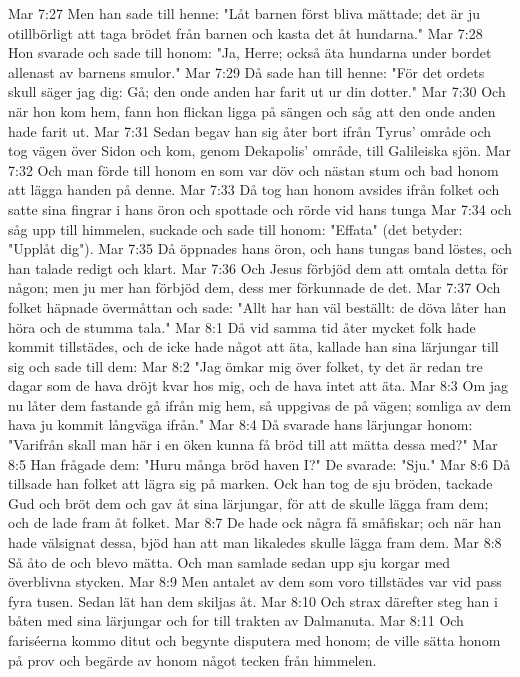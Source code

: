Mar 7:27  Men han sade till henne: "Låt barnen först bliva mättade; det är ju otillbörligt att taga brödet från barnen och kasta det åt hundarna."
Mar 7:28  Hon svarade och sade till honom: "Ja, Herre; också äta hundarna under bordet allenast av barnens smulor."
Mar 7:29  Då sade han till henne: "För det ordets skull säger jag dig: Gå; den onde anden har farit ut ur din dotter."
Mar 7:30  Och när hon kom hem, fann hon flickan ligga på sängen och såg att den onde anden hade farit ut.
Mar 7:31  Sedan begav han sig åter bort ifrån Tyrus' område och tog vägen över Sidon och kom, genom Dekapolis' område, till Galileiska sjön.
Mar 7:32  Och man förde till honom en som var döv och nästan stum och bad honom att lägga handen på denne.
Mar 7:33  Då tog han honom avsides ifrån folket och satte sina fingrar i hans öron och spottade och rörde vid hans tunga
Mar 7:34  och såg upp till himmelen, suckade och sade till honom: "Effata" (det betyder: "Upplåt dig").
Mar 7:35  Då öppnades hans öron, och hans tungas band löstes, och han talade redigt och klart.
Mar 7:36  Och Jesus förbjöd dem att omtala detta för någon; men ju mer han förbjöd dem, dess mer förkunnade de det.
Mar 7:37  Och folket häpnade övermåttan och sade: "Allt har han väl beställt: de döva låter han höra och de stumma tala."
Mar 8:1  Då vid samma tid åter mycket folk hade kommit tillstädes, och de icke hade något att äta, kallade han sina lärjungar till sig och sade till dem:
Mar 8:2  "Jag ömkar mig över folket, ty det är redan tre dagar som de hava dröjt kvar hos mig, och de hava intet att äta.
Mar 8:3  Om jag nu låter dem fastande gå ifrån mig hem, så uppgivas de på vägen; somliga av dem hava ju kommit långväga ifrån."
Mar 8:4  Då svarade hans lärjungar honom: "Varifrån skall man här i en öken kunna få bröd till att mätta dessa med?"
Mar 8:5  Han frågade dem: "Huru många bröd haven I?" De svarade: "Sju."
Mar 8:6  Då tillsade han folket att lägra sig på marken. Ock han tog de sju bröden, tackade Gud och bröt dem och gav åt sina lärjungar, för att de skulle lägga fram dem; och de lade fram åt folket.
Mar 8:7  De hade ock några få småfiskar; och när han hade välsignat dessa, bjöd han att man likaledes skulle lägga fram dem.
Mar 8:8  Så åto de och blevo mätta. Och man samlade sedan upp sju korgar med överblivna stycken.
Mar 8:9  Men antalet av dem som voro tillstädes var vid pass fyra tusen. Sedan lät han dem skiljas åt.
Mar 8:10  Och strax därefter steg han i båten med sina lärjungar och for till trakten av Dalmanuta.
Mar 8:11  Och fariséerna kommo ditut och begynte disputera med honom; de ville sätta honom på prov och begärde av honom något tecken från himmelen.
